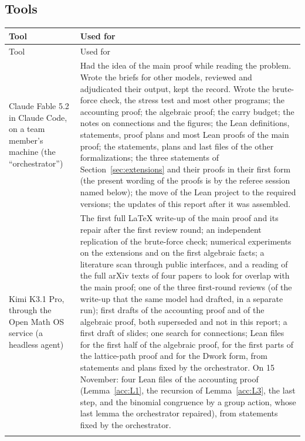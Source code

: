 \documentclass[11pt]{article}
\theoremstyle{definition}
\theoremstyle{remark}
\numberwithin{equation}{section}
\numberwithin{figure}{section}
\begin{document}
\subsection{Tools}
{\small
\begin{longtable}{@{}>{\raggedright\arraybackslash}p{}>{\raggedright\arraybackslash}p{}@{}}
\toprule
Tool & Used for\\
\midrule
\endfirsthead
\toprule
Tool & Used for\\
\midrule
\endhead
\bottomrule
\endfoot
Claude Fable 5.2 in Claude Code, on a team member's machine (the ``orchestrator'') & Had the idea of the
 main proof while reading the problem. Wrote the briefs for other models, reviewed and adjudicated their
 output, kept the record. Wrote the brute-force check, the stress test and most other programs; the
 accounting proof; the algebraic proof; the carry budget; the notes on connections and the figures; the Lean
 definitions, statements, proof plans and most Lean proofs of the main proof; the statements, plans and last
 files of the other formalizations; the three statements of Section~\ref{sec:extensions} and their proofs in
 their first form (the present wording of the proofs is by the referee session named below); the move of the
 Lean project to the required versions; the updates of this report after it was assembled.\\\addlinespace[3pt]
Kimi K3.1 Pro, through the Open Math OS service (a headless agent) & The first full \LaTeX{} write-up of the
 main proof and its repair after the first review round; an independent replication of the brute-force check;
 numerical experiments on the extensions and on the first algebraic facts; a literature scan through public
 interfaces, and a reading of the full arXiv texts of four papers to look for overlap with the main proof;
 one of the three first-round reviews (of the write-up that the same model had drafted, in a separate run);
 first drafts of the accounting proof and of the algebraic proof, both superseded and not in this report; a
 first draft of slides; one search for connections; Lean files for the first half of the algebraic proof, for the
 first parts of the lattice-path proof and for the Dwork form, from statements and plans fixed by the
 orchestrator. On 15 November: four Lean files of the accounting proof (Lemma~\ref{acc:L1}, the recursion
 of Lemma~\ref{acc:L3}, the last step, and the binomial congruence by a group action, whose last lemma the
 orchestrator repaired), from statements fixed by the orchestrator.\\\addlinespace[3pt]

\end{longtable}}
\end{document}
